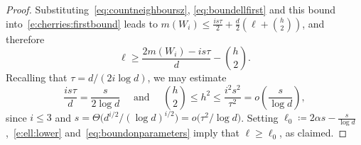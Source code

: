 \documentclass[reqno,a4paper,11pt]{amsart}
\theoremstyle{definition}
\renewcommand{\leq}{\leqslant}
\renewcommand{\geq}{\geqslant}
\begin{document}
\begin{proof}
  Substituting~\eqref{eq:countneighboursz}, \eqref{eq:boundellfirst} and this bound into~\eqref{e:cherries:firstbound} leads to $m(W_i) \leq \frac{is\tau}{2} + \frac{d}{2}\left(\ell + \binom{h}{2}\right)$, and therefore
  \begin{equation}\label{e:ell:lower}
    \ell \geq \frac{2m(W_i) - is\tau}{d} - \binom{h}{2}.
  \end{equation}
  Recalling that $\tau = d / (2 i \log d)$, we may estimate
  \begin{equation}\label{eq:boundonparameters}
    \frac{is\tau}{d} = \frac{s}{2\log d} \quad \text{ and } \quad \binom{h}{2} \leq h^2 \leq \frac{i^2 s^2}{\tau^2} = o\left(\frac{s}{\log d}\right),
  \end{equation}
  since $i \leq 3$ and $s = \Theta\bigl(d^{i/2}/(\log d)^{i/2}\bigr) = o\bigl(\tau^2 / \log d\bigr)$.
  Setting $\ell_0 \coloneqq 2\alpha s - \frac{s}{\log d}$,~\eqref{e:ell:lower} and~\eqref{eq:boundonparameters} imply that $\ell \geq \ell_0$, as claimed.


\end{proof}
\end{document}
